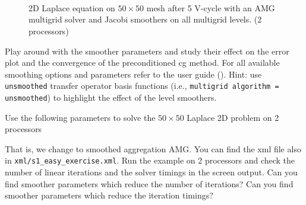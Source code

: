\documentclass[10pt,fleqn]{book}
\begin{document}
\begin{figure}
\hspace{0.03\textwidth}
\hspace{0.03\textwidth}
 \\
\hspace{0.03\textwidth}
\hspace{0.03\textwidth}
 \\
\hspace{0.03\textwidth}
\hspace{0.03\textwidth}
 \\
\caption{2D Laplace equation on $50\times 50$ mesh after 5 V-cycle with an AMG multigrid solver and Jacobi smoothers on all multigrid levels. (2 processors)}
\label{fig:5vcycles}
\end{figure}

\begin{exercise}
Play around with the smoother parameters and study their effect on the error plot and the convergence of the preconditioned cg method. For all available smoothing options and parameters refer to the \muelu user guide (\cite{Mue}). Hint: use \texttt{unsmoothed} transfer operator basis functions (i.e., \texttt{multigrid algorithm = unsmoothed}) to highlight the effect of the level smoothers.
\end{exercise}
\begin{exercise}
Use the following parameters to solve the $50\times 50$ Laplace 2D problem on 2 processors
 
 That is, we change to smoothed aggregation AMG. You can find the xml file also in \texttt{xml/s1\_easy\_exercise.xml}.
 Run the example on 2 processors and check the number of linear iterations and the solver timings in the screen output.
 Can you find smoother parameters which reduce the number of iterations? Can you find smoother parameters which reduce the iteration timings?
\end{exercise}
\end{document}
